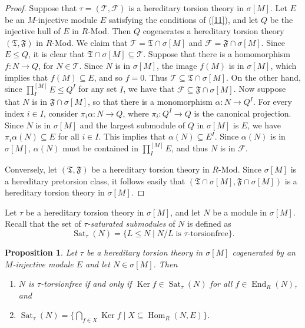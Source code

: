 \documentclass{amsart}
\newtheorem{prop}[thm]{Proposition}
\theoremstyle{definition}
\theoremstyle{remark}
\numberwithin{equation}{section}
\DeclareMathOperator{\Ker}{Ker}
\DeclareMathOperator{\Hom}{Hom}
\DeclareMathOperator{\End}{End}
\DeclareMathOperator{\Sat}{Sat}
\newcommand{\sm}{\sigma[M]}
\begin{document}
	\begin{proof}
		Suppose that $\tau=(\mathcal{T},\mathcal{F})$ 
		is a hereditary torsion theory in $\sm$. 
		Let $E$ be an $M$-injective module $E$ satisfying 
		the conditions of (\ref{11}), 
		and let $Q$ be the injective hull of $E$ in $R$-Mod. 
		Then $Q$ cogenerates a hereditary torsion theory 
		$(\mathfrak{T},\mathfrak{F})$ in $R$-Mod. 
		We claim that $\mathcal{T}=\mathfrak{T}\cap\sm$ and 
		$\mathcal{F}=\mathfrak{F}\cap\sm$. 
		Since $E\leq Q$, 
		it is clear that $\mathfrak{T}\cap\sm\subseteq \mathcal{T}$. 
		Suppose that there is a homomorphism $f:N\to Q$,
		for $N\in\mathcal{T}$. 
		Since $N$ is in $\sm$, 
		the image $f(M)$ is in $\sm$, 
		which implies that $f(M)\subseteq E$, and so $f=0$. 
		Thus $\mathcal{T}\subseteq\mathfrak{T}\cap\sm$. 
		On the other hand, since $\prod_I^{[M]}E\leq Q^I$ for any set $I$, 
		we have that $\mathcal{F}\subseteq \mathfrak{F}\cap\sm$. 
		Now suppose that $N$ is in $\mathfrak{F}\cap\sm$, 
		so that there is a monomorphism $\alpha:N\to Q^I$. 
		For every index $i\in I$, 
		consider $\pi_i\alpha:N\to Q$, 
		where $\pi_i:Q^I\to Q$ is the canonical projection. 
		Since $N$ is in $\sm$ and the largest submodule of $Q$ in $\sm$ is $E$, 
		we have $\pi_i\alpha(N)\subseteq E$ for all $i\in I$. 
		This implies that $\alpha(N)\subseteq E^I$. 
		Since $\alpha(N)$ is in $\sm$, 
		$\alpha(N)$ must be contained in $\prod_I^{[M]}E$, 
		and thus $N$ is in $\mathcal{F}$. 
		
		Conversely, let $(\mathfrak{T},\mathfrak{F})$ 
		be a hereditary torsion theory in $R$-Mod. 
		Since $\sm$ is a hereditary pretorsion class,
		it follows easily that $(\mathfrak{T}\cap\sm,\mathfrak{F}\cap\sm)$ 
		is a hereditary torsion theory in $\sm$.	
	\end{proof}
	
	Let $\tau$ be a hereditary torsion theory in $\sm$, 
	and let $N$ be a module in $\sm$. 
	Recall that the set of \emph{$\tau$-saturated submodules} of $N$ 
	is defined as 
	\[\Sat_\tau(N)=\{L\leq N\mid N/L\;\text{is $\tau$-torsionfree}\}.\]
	
	
	\begin{prop}\label{annihilatorsat}
		Let $\tau$ be a hereditary torsion theory in $\sm$ 
		cogenerated by an $M$-injective module $E$ 
		and let $N\in\sm$. 
		Then 
		\begin{enumerate}
			\item $N$ is $\tau$-torsionfree if and only if 
			$\Ker f\in\Sat_\tau(N)$ for all $f\in\End_R(N)$, and
			\item $\Sat_\tau(N)
			=\{\bigcap_{f\in X}\Ker f\mid X\subseteq\Hom_R(N,E)\}$.
		\end{enumerate}
	\end{prop}
	
\end{document}
